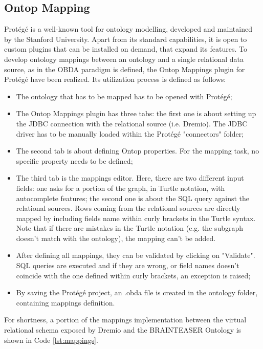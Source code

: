 \subsection{Ontop Mapping}
Protégé is a well-known tool for ontology modelling, developed and maintained by the Stanford University. Apart from its standard capabilities, it is open to custom plugins that can be installed on demand, that expand its features.
To develop ontology mappings between an ontology and a single relational data source, as in the \ac{OBDA} paradigm is defined, the Ontop Mappings plugin for Protégé have been realized. Its utilization process is defined as follows:
\begin{itemize}
  \item The ontology that has to be mapped has to be opened with Protégé;
  \item The Ontop Mappings plugin has three tabs: the first one is about setting up the \ac{JDBC} connection with the relational source (i.e. Dremio). The \ac{JDBC} driver has to be manually loaded within the Protégé "connectors" folder;
  \item The second tab is about defining Ontop properties. For the mapping task, no specific property needs to be defined;
  \item The third tab is the mappings editor. Here, there are two different input fields: one asks for a portion of the graph, in Turtle notation, with autocomplete features; the second one is about the \ac{SQL} query against the relational sources. Rows coming from the relational sources are directly mapped by including fields name within curly brackets in the Turtle syntax. Note that if there are mistakes in the Turtle notation (e.g. the subgraph doesn't match with the ontology), the mapping can't be added.
  \item After defining all mappings, they can be validated by clicking on "Validate". \ac{SQL} queries are executed and if they are wrong, or field names doesn't coincide with the one defined within curly brackets, an exception is raised;
  \item By saving the Protégé project, an .obda file is created in the ontology folder, containing mappings definition.
\end{itemize}  

For shortness, a portion of the mappings implementation between the virtual relational schema exposed by Dremio and the \ac{BRAINTEASER} Ontology is shown in Code \ref{lst:mappings}.

